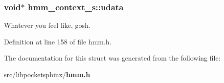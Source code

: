 \subsubsection[{udata}]{\setlength{\rightskip}{0pt plus 5cm}void$\ast$ hmm\-\_\-context\-\_\-s\-::udata}\label{structhmm__context__s_a1f80af93746230d41b4ee7e89786a4c7}


Whatever you feel like, gosh. 



Definition at line 158 of file hmm.\-h.



The documentation for this struct was generated from the following file\-:\begin{DoxyCompactItemize}
\item 
src/libpocketsphinx/{\bf hmm.\-h}\end{DoxyCompactItemize}
